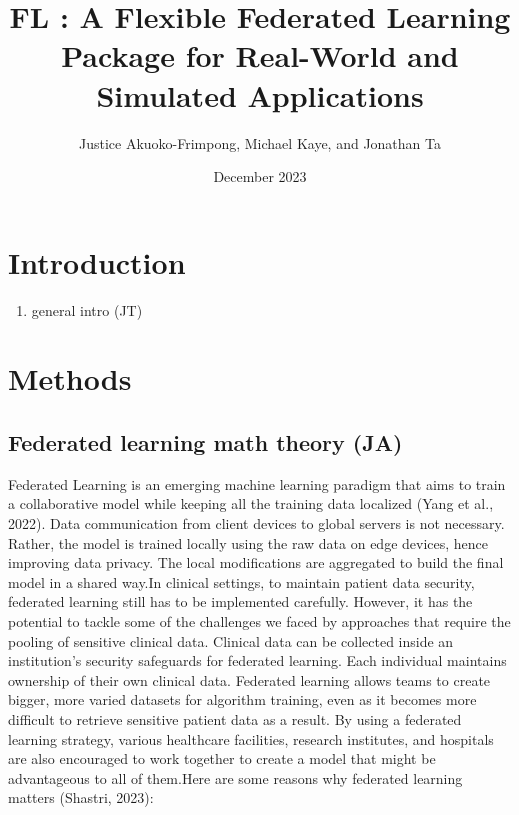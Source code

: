 \documentclass[
]{article}
\title{FL : A Flexible Federated Learning Package for Real-World and
Simulated Applications}
\author{Justice Akuoko-Frimpong, Michael Kaye, and Jonathan Ta}
\date{December 2023}
\providecommand{\tightlist}{%
  \setlength{\itemsep}{0pt}\setlength{\parskip}{0pt}}
\begin{document}
\maketitle

\hypertarget{introduction}{%
\section{Introduction}\label{introduction}}

\begin{enumerate}
\def\labelenumi{\arabic{enumi})}
\tightlist
\item
  general intro (JT)
\end{enumerate}

\hypertarget{methods}{%
\section{Methods}\label{methods}}

\hypertarget{federated-learning-math-theory-ja}{%
\subsection{Federated learning math theory
(JA)}\label{federated-learning-math-theory-ja}}

Federated Learning is an emerging machine learning paradigm that aims to
train a collaborative model while keeping all the training data
localized (Yang et al., 2022). Data communication from client devices to
global servers is not necessary. Rather, the model is trained locally
using the raw data on edge devices, hence improving data privacy. The
local modifications are aggregated to build the final model in a shared
way.\newline In clinical settings, to maintain patient data security,
federated learning still has to be implemented carefully. However, it
has the potential to tackle some of the challenges we faced by
approaches that require the pooling of sensitive clinical data. Clinical
data can be collected inside an institution's security safeguards for
federated learning. Each individual maintains ownership of their own
clinical data. Federated learning allows teams to create bigger, more
varied datasets for algorithm training, even as it becomes more
difficult to retrieve sensitive patient data as a result. By using a
federated learning strategy, various healthcare facilities, research
institutes, and hospitals are also encouraged to work together to create
a model that might be advantageous to all of them.Here are some reasons
why federated learning matters (Shastri, 2023):
\end{document}
